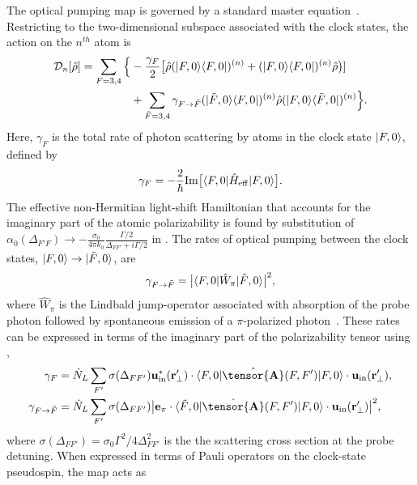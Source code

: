 \documentclass[aps,pra,twocolumn]{revtex4-1} %
\newcommand{\inp}{{\rm in}}
\newcommand{\charpol}{\alpha_0(\Delta_{F'F})}
\begin{document}
The optical pumping map is governed by a standard master equation~\cite{deutsch_quantum_2010}.  
Restricting to the two-dimensional subspace associated with the clock states, the action on the $n^{th}$ atom is
	\begin{align}
		\mathcal{D}_n[\hat{\rho}] =  \sum_{F=3,4} \Big\{& -\frac{\gamma_{F}}{2} \big[ \hat{\rho} (\lvert{F,0}\rangle\langle{F,0}\rvert)^{(n)} + (\lvert{F,0}\rangle\langle{F,0}\rvert)^{(n)}\hat{\rho} \big)]\\
		&+  \sum_{\tilde{F} =3,4}  \gamma_{F \rightarrow \tilde{F}}(\lvert{\tilde{F},0}\rangle\langle{F,0}\rvert)^{(n)} \hat{\rho}(\lvert{F,0}\rangle\langle{\tilde{F},0}\rvert)^{(n)} \Big\}.\nonumber
	\end{align}
Here, $\gamma_{F}$ is the total rate of photon scattering by atoms in the clock state $\lvert{F,0}\rangle$, defined by
	\begin{equation}
		\gamma_{F}=- \frac{2}{\hbar} {\rm Im} \big[ \langle{F,0}\rvert \hat{H}_{\rm eff}\lvert{F,0}\rangle \big] .
	\end{equation}
The effective non-Hermitian light-shift Hamiltonian that accounts for the imaginary part of the atomic polarizability is found by substitution of $\charpol \rightarrow -\frac{\sigma_0}{4\pi k_0}\frac{\Gamma/2}{\Delta_{FF'}+i\Gamma/2}$ in .  The rates of optical pumping between the clock states, $\lvert{F,0}\rangle \rightarrow \lvert{\tilde{F},0}\rangle$, are
	\begin{equation}
		\gamma_{F \rightarrow \tilde{F} } =\big| \langle{F,0}\rvert \hat{W}_\pi \lvert{\tilde{F},0}\rangle \big|^2,
	\end{equation}
where $\hat{W}_\pi$ is the Lindbald jump-operator associated with absorption of the probe photon followed by spontaneous emission of a $\pi$-polarized photon~\cite{deutsch_quantum_2010}.  These rates can be expressed in terms of the imaginary part of the polarizability tensor using ,
	\begin{align}
		\gamma_F &=\dot{N}_L  \sum_{F'} \sigma (\Delta_{FF'} ) \mathbf{u}^*_\inp(\br'_\perp)\cdot \bra{F,0} \hat{\tensor{\mbf{A}}}(F,F') \ket{F,0}  \cdot \mathbf{u}_\inp(\br'_\perp), \\
		\gamma_{F \rightarrow \tilde{F}}&=  \dot{N}_L  \sum_{F'} \sigma (\Delta_{FF'}) \big| \mathbf{e}_\pi\cdot \bra{\tilde{F},0} \hat{\tensor{\mbf{A}}}(F,F') \ket{F,0}  \cdot \mathbf{u}_\inp(\br'_\perp) \big|^2 ,
	\end{align}
where $ \sigma (\Delta_{FF'} )  = \sigma_0 \Gamma^2/4\Delta^2_{FF'}$ is the the scattering cross section at the probe detuning. When expressed in terms of Pauli operators on the clock-state pseudospin, the map acts as
\end{document}
